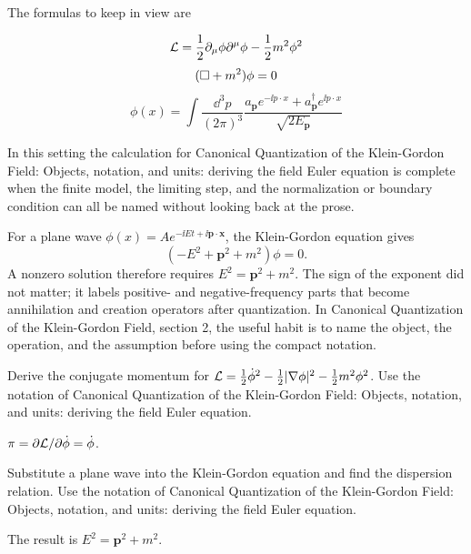 The formulas to keep in view are

\[
  \mathcal L=\frac12\partial_\mu\phi\partial^\mu\phi-\frac12m^2\phi^2
\]
\[
  (\Box+m^2)\phi=0
\]
\[
  \phi(x)=\int\frac{\dd^3p}{(2\pi)^3}\frac{a_{\bm p}e^{-\ii p\cdot x}+a_{\bm p}^\dagger e^{\ii p\cdot x}}{\sqrt{2E_{\bm p}}}
\]

In this setting the calculation for Canonical Quantization of the Klein-Gordon Field: Objects, notation, and units: deriving the field Euler equation is complete when the finite model, the limiting step, and the normalization or boundary condition can all be named without looking back at the prose.




\begin{example}
For a plane wave \(\phi(x)=Ae^{-\ii Et+\ii\bm p\cdot\bm x}\), the Klein-Gordon equation gives
\[
  (-E^2+\bm p^2+m^2)\phi=0.
\]
A nonzero solution therefore requires \(E^2=\bm p^2+m^2\).  The sign of the exponent did not matter; it labels positive- and negative-frequency parts that become annihilation and creation operators after quantization.  In Canonical Quantization of the Klein-Gordon Field, section 2, the useful habit is to name the object, the operation, and the assumption before using the compact notation.
\end{example}



\begin{exercise}
Derive the conjugate momentum for \(\mathcal L=\frac12\dot\phi^2-\frac12|\nabla\phi|^2-\frac12m^2\phi^2\).  Use the notation of Canonical Quantization of the Klein-Gordon Field: Objects, notation, and units: deriving the field Euler equation.
\begin{answer}
\(\pi=\partial\mathcal L/\partial\dot\phi=\dot\phi\).
\end{answer}
\end{exercise}

\begin{exercise}
Substitute a plane wave into the Klein-Gordon equation and find the dispersion relation.  Use the notation of Canonical Quantization of the Klein-Gordon Field: Objects, notation, and units: deriving the field Euler equation.
\begin{answer}
The result is \(E^2=\bm p^2+m^2\).
\end{answer}
\end{exercise}



